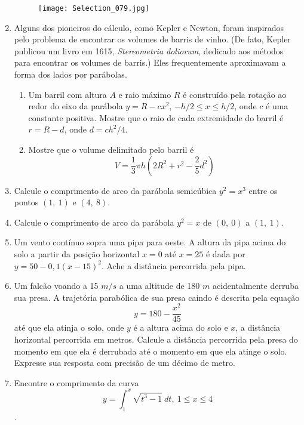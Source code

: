 \documentclass[11pt,a4paper]{article}
\begin{document}
\begin{enumerate}
    \begin{figure}[h]	
	\centering %
	\texttt{[image: Selection\_079.jpg]} 
	\end{figure}
    
     \item Alguns dos pioneiros do cálculo, como Kepler e Newton, foram inspirados pelo problema de encontrar os volumes de barris de vinho. (De fato, Kepler publicou um livro em 1615, \textit{Stereometria doliorum}, dedicado aos métodos para encontrar os volumes de barris.) Eles frequentemente aproximavam a forma dos lados por parábolas. 
     \begin{enumerate}
     \item Um barril com altura $A$ e raio máximo $R$ é construído pela rotação ao redor do eixo da parábola $y = R - cx^2$, $-h/2 \leq x \leq h/2$, onde $c$ é uma constante positiva. Mostre que o raio de cada extremidade do barril é $r = R - d$, onde $d = ch^2/4$.
     \item Mostre que o volume delimitado pelo barril é
     $$V = \displaystyle\dfrac{1}{3} \pi h \left(2R^2 + r^2 - \displaystyle\dfrac{2}{5}d^2\right)$$
     \end{enumerate}
     
     \item Calcule o comprimento de arco da parábola semicúbica $y^2 = x^3$ entre os pontos $(1 \mathrm{, } \ 1)$ e $(4 \mathrm{, } \ 8)$. 
		
	 \item Calcule o comprimento de arco da parábola $y^2 = x$ de $(0 \mathrm{, } \ 0)$ a $(1 \mathrm{, } \ 1)$.
	 \item Um vento contínuo sopra uma pipa para oeste. A altura da pipa acima do solo a partir da posição horizontal $x = 0$ até $x = 25$ é dada por $y = 50 - 0,1(x - 15)^2.$ Ache a distância percorrida pela pipa.
	 
	 \item Um falcão voando a 15 $m/s$ a uma altitude de 180 $m$ acidentalmente derruba sua presa. A trajetória parabólica de sua presa caindo é descrita pela equação
	 $$y = 180 - \displaystyle\dfrac{x^2}{45}$$
	 até que ela atinja o solo, onde $y$ é a altura acima do solo e $x$, a distância horizontal percorrida em metros. Calcule a distância percorrida pela presa do momento em que ela é derrubada até o momento em que ela atinge o solo. Expresse sua resposta com precisão de um décimo de metro. 
	 
	 \item Encontre o comprimento da curva
	 $$y = \displaystyle\int_1^x \sqrt{t^3 - 1} \ dt \mathrm{, } \ 1 \leq x \leq 4$$.
	 

\end{enumerate}
\end{document}
